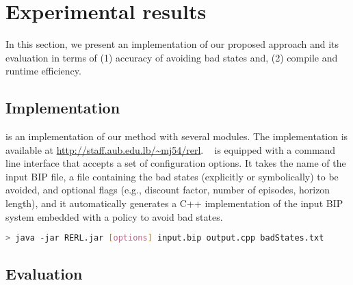 \section{Experimental results}
\label{sec:bench}
In this section, we present \rerl an implementation of our proposed approach and its evaluation in terms of (1) accuracy of avoiding bad states and, (2) compile and runtime efficiency. 
\subsection{Implementation}
\rerl is an implementation of our method with several modules. The implementation is available at \href{http://staff.aub.edu.lb/~mj54/rerl}{http://staff.aub.edu.lb/\~{}mj54/rerl}. 
\rerl~ is equipped with a command line interface that accepts a set of configuration options. 
It takes the name of the input BIP file, a file containing the bad states (explicitly or symbolically) to be avoided,  and optional flags (e.g., discount factor, number of episodes, horizon length), and it automatically generates a C++ implementation of the input BIP system embedded with a policy to avoid bad states. 
\begin{lstlisting}[language=Bash]
> java -jar RERL.jar [options] input.bip output.cpp badStates.txt
\end{lstlisting}

\subsection{Evaluation}
